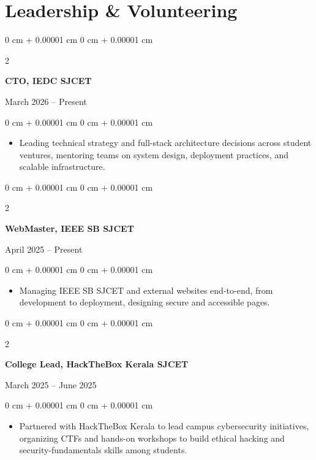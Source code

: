 \documentclass[10pt, a4paper]{article}
\newenvironment{highlights}{
    \begin{itemize}[
        topsep=0.10 cm,
        parsep=0.10 cm,
        partopsep=0pt,
        itemsep=0pt,
        leftmargin=0 cm + 10pt
    ]
}{
    \end{itemize}
} %
\newenvironment{onecolentry}{
    \begin{adjustwidth}{
        0 cm + 0.00001 cm
    }{
        0 cm + 0.00001 cm
    }
}{
    \end{adjustwidth}
} %
\newenvironment{twocolentry}[2][]{
    \onecolentry
    \def\secondColumn{#2}
    \setcolumnwidth{\fill, 4.5 cm}
    \begin{paracol}{2}
}{
    \switchcolumn \raggedleft \secondColumn
    \end{paracol}
    \endonecolentry
} %
\begin{document}
    \section{Leadership \& Volunteering}

    \vspace{0.2 cm}

\begin{twocolentry}{
    March 2026 – Present
}
    \textbf{CTO, IEDC SJCET}
\end{twocolentry}

\vspace{0.10 cm}
\begin{onecolentry}
    \begin{highlights}
        \item Leading technical strategy and full-stack architecture decisions across student ventures, mentoring teams on system design, deployment practices, and scalable infrastructure.
    \end{highlights}
\end{onecolentry}

\vspace{0.2 cm}

\begin{twocolentry}{
    April 2025 – Present
}
    \textbf{WebMaster, IEEE SB SJCET}
\end{twocolentry}

\vspace{0.10 cm}
\begin{onecolentry}
    \begin{highlights}
        \item Managing IEEE SB SJCET and external websites end-to-end, from development to deployment, designing secure and accessible pages.
    \end{highlights}
\end{onecolentry}

\vspace{0.2 cm}

\begin{twocolentry}{
    March 2025 – June 2025
}
    \textbf{College Lead, HackTheBox Kerala SJCET}
\end{twocolentry}

\vspace{0.10 cm}
\begin{onecolentry}
    \begin{highlights}
        \item Partnered with HackTheBox Kerala to lead campus cybersecurity initiatives, organizing CTFs and hands-on workshops to build ethical hacking and security-fundamentals skills among students.
    \end{highlights}
\end{onecolentry}
\end{document}
